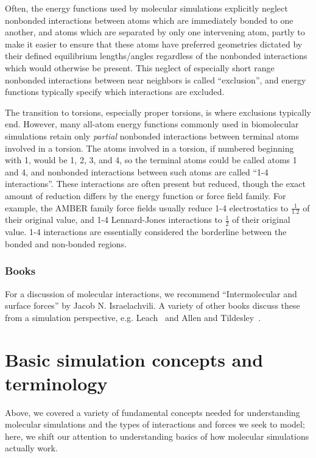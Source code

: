 \documentclass[9pt,bestpractices]{livecoms}
\begin{document}
Often, the energy functions used by molecular simulations explicitly neglect nonbonded interactions between atoms which are immediately bonded to one
another, and atoms which are separated by only one intervening atom, partly to make it easier to ensure that these atoms have preferred geometries dictated by their defined equilibrium lengths/angles regardless of the nonbonded interactions which would otherwise be present.
This neglect of especially short range nonbonded interactions between near neighbors is called ``exclusion'', and energy functions typically specify which interactions are excluded.

The transition to torsions, especially proper torsions, is where exclusions typically end.
However, many all-atom energy functions commonly used in biomolecular simulations retain only \emph{partial} nonbonded interactions between terminal atoms involved in a torsion.
The atoms involved in a torsion, if numbered beginning with 1, would be 1, 2, 3, and 4, so the terminal atoms could be called atoms 1 and 4, and nonbonded interactions between such atoms are called ``1-4 interactions''.
These interactions are often present but reduced, though the exact amount of reduction differs by the energy function or force field family.
For example, the AMBER family force fields usually reduce 1-4 electrostatics to $\frac{1}{1.2}$ of their original value, and 1-4 Lennard-Jones interactions to $\frac{1}{2}$ of their original value.
1-4 interactions are essentially considered the borderline between the bonded and non-bonded regions.


\subsubsection{Books}
For a discussion of molecular interactions, we recommend ``Intermolecular and surface forces'' by Jacob N. Israelachvili.
A variety of other books discuss these from a simulation perspective, e.g. Leach~\cite{LeachBook} and Allen and Tildesley~\cite{allen_computer_2017}.


\section{Basic simulation concepts and terminology}
\label{sec:basics}

Above, we covered a variety of fundamental concepts needed for understanding molecular simulations and the types of interactions and forces we seek to model; here, we shift our attention to understanding basics of how molecular simulations actually work.
\end{document}
